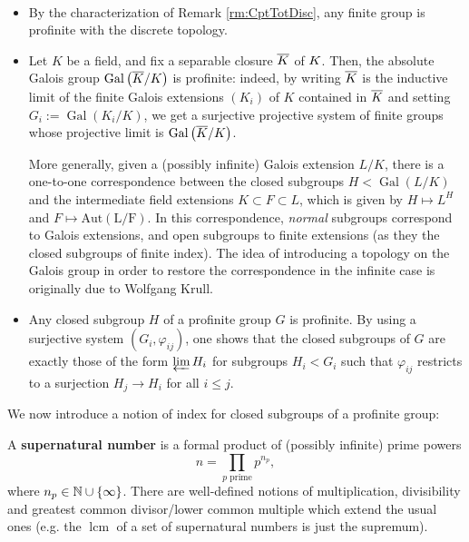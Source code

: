 \documentclass[a4paper, oneside]{memoir}
\begin{document}
\begin{example}\
	\begin{itemize}
		\item By the characterization of Remark \ref{rm:CptTotDisc}, any finite group is profinite with the discrete topology.
		\item Let $K$ be a field, and fix a separable closure $\overline{K}$ of $K$. Then, the absolute Galois group $\operatorname{Gal}\left( \overline{K}/K \right)$ is profinite: indeed, by writing $\overline{K}$ is the inductive limit of the finite Galois extensions $(K_i)$ of $K$ contained in $\overline{K}$ and setting $G_i:=\operatorname{Gal}{(K_i/K)}$, we get a surjective projective system of finite groups whose projective limit is $\operatorname{Gal}\left( \overline{K}/K \right)$.

		      More generally, given a (possibly infinite) Galois extension $L/K$, there is a one-to-one correspondence between the closed subgroups $H<\operatorname{Gal}{(L/K)}$ and the intermediate field extensions $K\subset F\subset L$, which is given by $H\mapsto L^H$ and $F\mapsto \operatorname{Aut(L/F)}$.
		      In this correspondence, \textit{normal} subgroups correspond to Galois extensions, and open subgroups to finite extensions (as they  the closed subgroups of finite index). The idea of introducing a topology on the Galois group in order to restore the correspondence in the infinite case is originally due to Wolfgang Krull.

		\item Any closed subgroup $H$ of a profinite group $G$ is profinite. By using a surjective system $(G_i,\varphi_{ij})$, one shows that the closed subgroups of $G$ are exactly those of the form $\varprojlim H_i$ for subgroups $H_i<G_i$ such that $\varphi_{ij}$ restricts to a surjection $H_j\to H_i$ for all $i\leq j$.
	\end{itemize}
\end{example}

We now introduce a notion of index for closed subgroups of a profinite group:

\begin{definition}
	A \textbf{supernatural number} is a formal product of (possibly infinite) prime powers
	\[
		n=\prod_{p\text{ prime}}{p^{n_p}},
	\]
	where $n_p\in\mathbb{N}\cup\{\infty\}$. There are well-defined notions of multiplication, divisibility and greatest common divisor/lower common multiple which extend the usual ones (e.g. the $\operatorname{lcm}$ of a set of supernatural numbers is just the supremum).
\end{definition}
\end{document}
